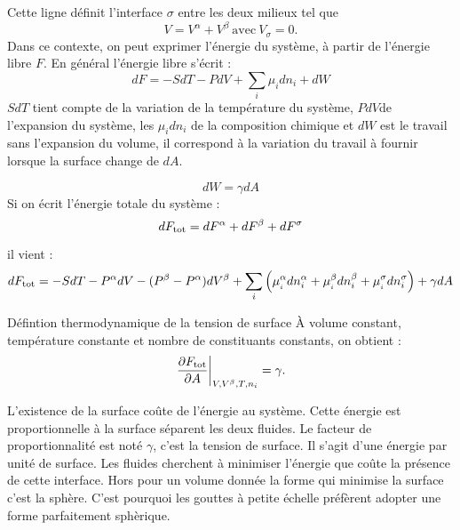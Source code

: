 \documentclass[french, a4paper, 10pt, twocolumn, landscape]{article}
\begin{document}
Cette ligne d{\'e}finit l'interface $\sigma$ entre les deux milieux tel que
\begin{equation} 
    V = V^{\alpha} + V^{\beta}~ \text{avec}~ V_{\sigma} = 0. 
\end{equation}
Dans ce contexte, on peut exprimer l'{\'e}nergie du syst{\`e}me, {\`a} partir de l'{\'e}nergie libre $F$. En g{\'e}n{\'e}ral l'{\'e}nergie libre s'{\'e}crit :
\begin{equation}
  d F = - S d T - P d V + \sum_i \mu_i dn_i + d W
\end{equation}
$S d T$ tient compte de la variation de la temp{\'e}rature du syst{\`e}me, $Pd V$de l'expansion du syst{\`e}me, les $\mu_i d n_i$ de la composition chimique et $d W$ est le travail sans l'expansion du volume, il correspond {\`a} la variation du travail {\`a} fournir lorsque la surface change de $dA$.

\begin{equation}
  d W = \gamma d A
\end{equation}
Si on {\'e}crit l'{\'e}nergie totale du syst{\`e}me :
\begin{equation}
   d F_{\rm tot} = d F^\alpha + d F^\beta + d F^\sigma
\end{equation}

il vient :
\begin{equation}
   d F_{\rm tot} = - S d T - P^{\alpha} d V - (P^{\beta} - P^{\alpha}) dV^{\beta} + \sum_i \left(\mu_{_i }^{\alpha} d n_i^{\alpha} + \mu_{_i }^{\beta} dn_i^{\beta} + \mu_{_i }^{\sigma} d n_i^{\sigma}\right) + \gamma d A
\end{equation}

\begin{definition}{Défintion thermodynamique de la tension de surface}
À volume constant, temp{\'e}rature constante et nombre de constituants constants, on obtient :
\begin{equation}
    \left. \dfrac{\partial F_{\rm tot}}{\partial A} \right|_{V, V^{\beta},
    T, n_i} = \gamma.
\end{equation}
\end{definition}
L'existence de la surface coûte de l'énergie au système. Cette énergie est proportionnelle à la surface séparent les deux fluides. Le facteur de proportionnalité est noté $\gamma$, c'est la tension de surface. Il s'agit d'une énergie par unité de surface. Les
fluides cherchent à minimiser l'énergie que coûte la présence
de cette interface. Hors pour un volume donnée la forme qui minimise la
surface c'est la sphère. C'est pourquoi les gouttes à petite
échelle préfèrent adopter une forme parfaitement sphèrique.
\end{document}
